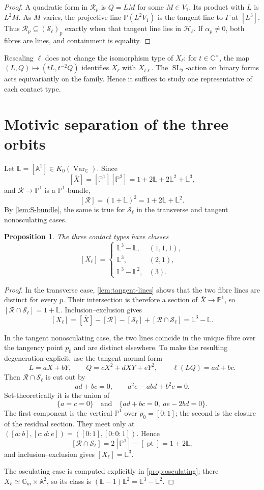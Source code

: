 \documentclass[11pt,reqno]{amsart}
\newtheorem{proposition}[proposition]{Proposition}
\theoremstyle{definition}
\theoremstyle{remark}
\newcommand{\A}{\mathbb A}
\newcommand{\Pj}{\mathbb P}
\newcommand{\Gm}{\mathbb G_m}
\newcommand{\C}{\mathbb C}
\newcommand{\cR}{\mathcal R}
\newcommand{\cS}{\mathcal S}
\newcommand{\cH}{\mathscr H}
\newcommand{\LL}{\mathbb L}
\newcommand{\KVar}{K_0(\operatorname{Var}_{\C})}
\begin{document}
\begin{proof}
A quadratic form in $\cR_p$ is $Q=LM$ for some $M\in V_1$.  Its product
with $L$ is $L^2M$.  As $M$ varies, the projective line
$\Pj(L^2V_1)$ is the tangent line to $\Gamma$ at $[L^3]$.  Thus
$\cR_p\subseteq(\cS_\ell)_p$ exactly when that tangent line lies in
$\cH_\ell$.  If $\alpha_p\ne0$, both fibres are lines, and containment
is equality.
\end{proof}

Rescaling $\ell$ does not change the isomorphism type of $X_\ell$: for
$t\in\C^\times$, the map $(L,Q)\mapsto(tL,t^{-2}Q)$ identifies
$X_\ell$ with $X_{t\ell}$.  The $\operatorname{SL}_2$-action on binary
forms acts equivariantly on the family.  Hence it suffices to study one
representative of each contact type.

\section{Motivic separation of the three orbits}

Let $\LL=[\A^1]\in\KVar$.  Since
\[
 [\overline X]=[\Pj^1][\Pj^2]
 =1+2\LL+2\LL^2+\LL^3,
\]
and $\cR\to\Pj^1$ is a $\Pj^1$-bundle,
\[
 [\cR]=(1+\LL)^2=1+2\LL+\LL^2.
\]
By \cref{lem:S-bundle}, the same is true for $\cS_\ell$ in the
transverse and tangent nonosculating cases.

\begin{proposition}\label{prop:motivic-classes}
The three contact types have classes
\[
 [X_\ell]=
 \begin{cases}
 \LL^3-\LL,&(1,1,1),\\
 \LL^3,&(2,1),\\
 \LL^3-\LL^2,&(3).
 \end{cases}
\]
\end{proposition}

\begin{proof}
In the transverse case, \cref{lem:tangent-lines} shows that the two fibre
lines are distinct for every $p$.  Their intersection is therefore a
section of $\overline X\to\Pj^1$, so
$[\cR\cap\cS_\ell]=1+\LL$.  Inclusion--exclusion gives
\[
 [X_\ell]
 =[\overline X]-[\cR]-[\cS_\ell]+[\cR\cap\cS_\ell]
 =\LL^3-\LL.
\]

In the tangent nonosculating case, the two lines coincide in the unique
fibre over the tangency point $p_0$ and are distinct elsewhere.  To make
the resulting degeneration explicit, use the tangent normal form
\[
 L=aX+bY,\qquad Q=cX^2+dXY+eY^2,\qquad \ell(LQ)=ad+bc.
\]
Then $\cR\cap\cS_\ell$ is cut out by
\[
 ad+bc=0,\qquad a^2e-abd+b^2c=0.
\]
Set-theoretically it is the union of
\[
 \{a=c=0\}
 \quad\text{and}\quad
 \{ad+bc=0,\ ae-2bd=0\}.
\]
The first component is the vertical $\Pj^1$ over $p_0=[0:1]$; the
second is the closure of the residual section.  They meet only at
$([a:b],[c:d:e])=([0:1],[0:0:1])$.  Hence
\[
 [\cR\cap\cS_\ell]
 =2[\Pj^1]-[\operatorname{pt}]
 =1+2\LL,
\]
and inclusion--exclusion gives $[X_\ell]=\LL^3$.

The osculating case is computed explicitly in
\cref{prop:osculating}; there $X_\ell\simeq\Gm\times\A^2$, so its class is
$(\LL-1)\LL^2=\LL^3-\LL^2$.
\end{proof}
\end{document}
